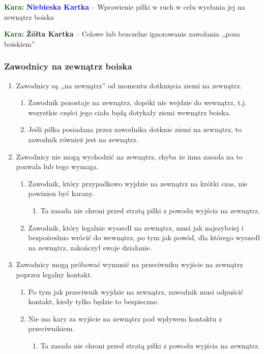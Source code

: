 \documentclass[11pt,a4paper]{article}
\newcommand\yellowcard[1]{\bgroup\textcolor{darkgreen}{\textbf{Kara: }}\bgroup\textcolor{darkyellow}{\textbf{Żółta Kartka}} -- #1}
\newcommand\bluecard[1]{\bgroup\textcolor{darkgreen}{\textbf{Kara: }}\bgroup\textcolor{blue}{\textbf{Niebieska Kartka}} -- #1}
\begin{document}
\bluecard{Wprawienie piłki w ruch w celu wysłania jej na zewnątrz boiska}

\yellowcard{Celowe lub bezczelne ignorowanie zawołania ,,poza boiskiem''}

\subsubsection{Zawodnicy na zewnątrz boiska}
\begin{enumerate}
  \item Zawodnicy są ,,na zewnątrz'' od momentu dotknięcia ziemi na zewnątrz.
  \begin{enumerate}
    \item Zawodnik pozostaje na zewnątrz, dopóki nie wejdzie do wewnątrz, t.j. wszystkie części jego ciała będą dotykały ziemi wewnątrz boiska.
    \item Jeśli piłka posiadana przez zawodnika dotknie ziemi na zewnątrz, to zawodnik również jest na zewnątrz.
  \end{enumerate}
  \item Zawodnicy nie mogą wychodzić na zewnątrz, chyba że inna zasada na to pozwala lub tego wymaga.
  \begin{enumerate}
    \item Zawodnik, który przypadkowo wyjdzie na zewnątrz na krótki czas, nie powinien być karany.
    \begin{enumerate}
      \item Ta zasada nie chroni przed stratą piłki z powodu wyjścia na zewnątrz.
    \end{enumerate}
    \item Zawodnik, który legalnie wyszedł na zewnątrz, musi jak najszybciej i bezpośrednio wrócić do wewnątrz, po tym jak powód, dla którego wyszedł na zewnątrz, zakończył swoje działanie.
  \end{enumerate}
  \item Zawodnicy mogą próbować wymusić na przeciwniku wyjście na zewnątrz poprzez legalny kontakt.
  \begin{enumerate}
    \item Po tym jak przeciwnik wyjdzie na zewnątrz, zawodnik musi odpuścić kontakt, kiedy tylko będzie to bezpieczne.
    \item Nie ma kary za wyjście na zewnątrz pod wpływem kontaktu z przeciwnikiem.
    \begin{enumerate}
      \item Ta zasada nie chroni przed stratą piłki z powodu wyjścia na zewnątrz.

\end{enumerate}
\end{enumerate}
\end{enumerate}
\end{document}
